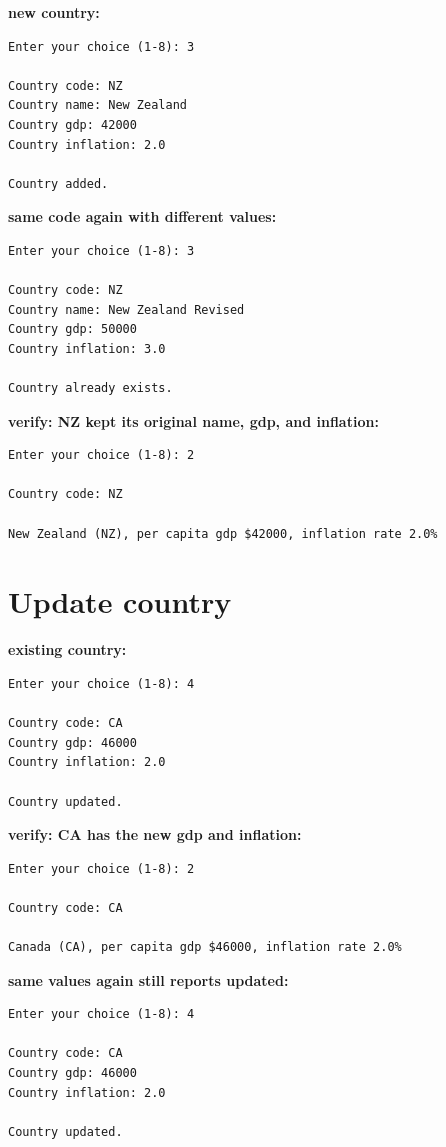 \documentclass[11pt]{article}
\begin{document}
\noindent \textbf{new country:}
{\small
\begin{verbatim}
Enter your choice (1-8): 3

Country code: NZ
Country name: New Zealand
Country gdp: 42000
Country inflation: 2.0

Country added.
\end{verbatim}
}

\noindent \textbf{same code again with different values:}
{\small
\begin{verbatim}
Enter your choice (1-8): 3

Country code: NZ
Country name: New Zealand Revised
Country gdp: 50000
Country inflation: 3.0

Country already exists.
\end{verbatim}
}

\noindent \textbf{verify: NZ kept its original name, gdp, and inflation:}
{\small
\begin{verbatim}
Enter your choice (1-8): 2

Country code: NZ

New Zealand (NZ), per capita gdp $42000, inflation rate 2.0%
\end{verbatim}
}

\section*{Update country}

\noindent \textbf{existing country:}
{\small
\begin{verbatim}
Enter your choice (1-8): 4

Country code: CA
Country gdp: 46000
Country inflation: 2.0

Country updated.
\end{verbatim}
}

\noindent \textbf{verify: CA has the new gdp and inflation:}
{\small
\begin{verbatim}
Enter your choice (1-8): 2

Country code: CA

Canada (CA), per capita gdp $46000, inflation rate 2.0%
\end{verbatim}
}

\noindent \textbf{same values again still reports updated:}
{\small
\begin{verbatim}
Enter your choice (1-8): 4

Country code: CA
Country gdp: 46000
Country inflation: 2.0

Country updated.
\end{verbatim}
}
\end{document}
